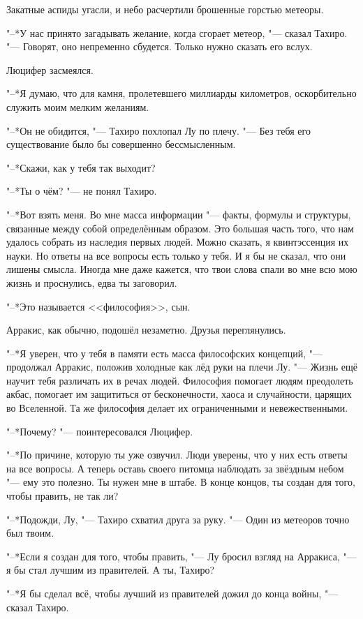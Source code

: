 \documentclass[a4paper,10pt]{book}
\begin{document}
Закатные аспиды угасли, и небо расчертили брошенные горстью метеоры. 

"--*У нас принято загадывать желание, когда сгорает метеор, "--- сказал Тахиро.
"--- Говорят, оно непременно сбудется.
Только нужно сказать его вслух.

Люцифер засмеялся.

"--*Я думаю, что для камня, пролетевшего миллиарды километров, оскорбительно служить моим мелким желаниям.

"--*Он не обидится, "--- Тахиро похлопал Лу по плечу.
"--- Без тебя его существование было бы совершенно бессмысленным.

"--*Скажи, как у тебя так выходит?

"--*Ты о чём? "--- не понял Тахиро.

"--*Вот взять меня.
Во мне масса информации "--- факты, формулы и структуры, связанные между собой определённым образом.
Это большая часть того, что нам удалось собрать из наследия первых людей.
Можно сказать, я квинтэссенция их науки.
Но ответы на все вопросы есть только у тебя. 
И я бы не сказал, что они лишены смысла.
Иногда мне даже кажется, что твои слова спали во мне всю мою жизнь и проснулись, едва ты заговорил.

"--*Это называется <<философия>>, сын.

Арракис, как обычно, подошёл незаметно.
Друзья переглянулись.

"--*Я уверен, что у тебя в памяти есть масса философских концепций, "--- продолжал Арракис, положив холодные как лёд руки на плечи Лу.
"--- Жизнь ещё научит тебя различать их в речах людей.
Философия помогает людям преодолеть акбас, помогает им защититься от бесконечности, хаоса и случайности, царящих во Вселенной.
Та же философия делает их ограниченными и невежественными.

"--*Почему? "--- поинтересовался Люцифер.

"--*По причине, которую ты уже озвучил.
Люди уверены, что у них есть ответы на все вопросы.
А теперь оставь своего питомца наблюдать за звёздным небом "--- ему это полезно.
Ты нужен мне в штабе.
В конце концов, ты создан для того, чтобы править, не так ли?

"--*Подожди, Лу, "--- Тахиро схватил друга за руку.
"--- Один из метеоров точно был твоим.

"--*Если я создан для того, чтобы править, "--- Лу бросил взгляд на Арракиса, "--- я бы стал лучшим из правителей.
А ты, Тахиро?

"--*Я бы сделал всё, чтобы лучший из правителей дожил до конца войны, "--- сказал Тахиро.
\end{document}
